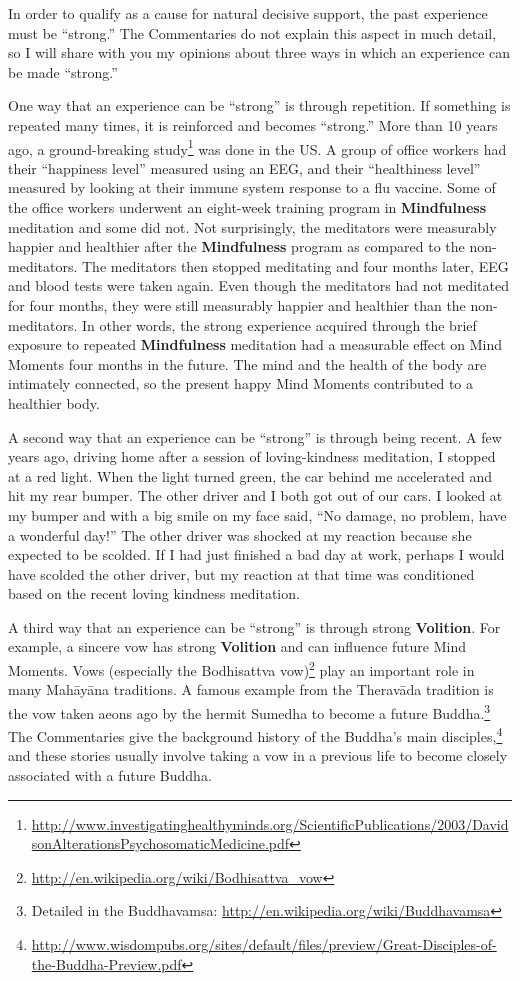 In order to qualify as a cause for natural decisive support, the past experience must be “strong.” The Commentaries do not explain this aspect in much detail, so I will share with you my opinions about three ways in which an experience can be made “strong.”

One way that an experience can be “strong” is through repetition. If something is repeated many times, it is reinforced and becomes “strong.” More than 10 years ago, a ground-breaking study\footnote{\url{http://www.investigatinghealthyminds.org/ScientificPublications/2003/DavidsonAlterationsPsychosomaticMedicine.pdf}} was done in the US. A group of office workers had their “happiness level” measured using an EEG, and their “healthiness level” measured by looking at their immune system response to a flu vaccine. Some of the office workers underwent an eight-week training program in \textbf{Mindfulness} meditation and some did not. Not surprisingly, the meditators were measurably happier and healthier after the \textbf{Mindfulness} program as compared to the non-meditators. The meditators then stopped meditating and four months later, EEG and blood tests were taken again. Even though the meditators had not meditated for four months, they were still measurably happier and healthier than the non-meditators. In other words, the strong experience acquired through the brief exposure to repeated \textbf{Mindfulness} meditation had a measurable effect on Mind Moments four months in the future. The mind and the health of the body are intimately connected, so the present happy Mind Moments contributed to a healthier body.

A second way that an experience can be “strong” is through being recent. A few years ago, driving home after a session of loving-kindness meditation, I stopped at a red light. When the light turned green, the car behind me accelerated and hit my rear bumper. The other driver and I both got out of our cars. I looked at my bumper and with a big smile on my face said, “No damage, no problem, have a wonderful day!” The other driver was shocked at my reaction because she expected to be scolded. If I had just finished a bad day at work, perhaps I would have scolded the other driver, but my reaction at that time was conditioned based on the recent loving kindness meditation.

A third way that an experience can be “strong” is through strong \textbf{Volition}. For example, a sincere vow has strong \textbf{Volition} and can influence future Mind Moments. Vows (especially the Bodhisattva vow)\footnote{\url{http://en.wikipedia.org/wiki/Bodhisattva_vow}} play an important role in many Mahāyāna traditions. A famous example from the Theravāda tradition is the vow taken aeons ago by the hermit Sumedha to become a future Buddha.\footnote{Detailed in the Buddhavamsa: \url{http://en.wikipedia.org/wiki/Buddhavamsa}} The Commentaries give the background history of the Buddha’s main disciples,\footnote{\url{http://www.wisdompubs.org/sites/default/files/preview/Great-Disciples-of-the-Buddha-Preview.pdf}} and these stories usually involve taking a vow in a previous life to become closely associated with a future Buddha.

